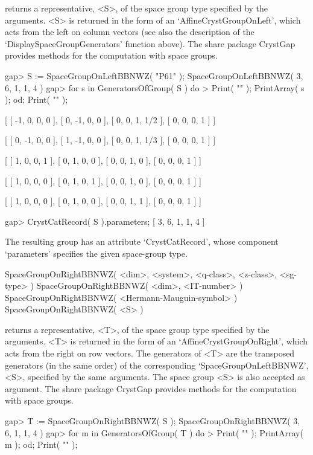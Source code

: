 returns a representative, <S>, of the space group type specified by 
the arguments. <S> is returned in the form of an `AffineCrystGroupOnLeft',
which acts from the left on column vectors (see also the description
of the `DisplaySpaceGroupGenerators' function above). The share package
CrystGap provides methods for the computation with space groups.

\beginexample
gap> S := SpaceGroupOnLeftBBNWZ( "P61" );
SpaceGroupOnLeftBBNWZ( 3, 6, 1, 1, 4 )
gap> for s in GeneratorsOfGroup( S ) do
>  Print( "\n" ); PrintArray( s ); od; Print( "\n" );

[ [   -1,    0,    0,    0 ],
  [    0,   -1,    0,    0 ],
  [    0,    0,    1,  1/2 ],
  [    0,    0,    0,    1 ] ]

[ [    0,   -1,    0,    0 ],
  [    1,   -1,    0,    0 ],
  [    0,    0,    1,  1/3 ],
  [    0,    0,    0,    1 ] ]

[ [  1,  0,  0,  1 ],
  [  0,  1,  0,  0 ],
  [  0,  0,  1,  0 ],
  [  0,  0,  0,  1 ] ]

[ [  1,  0,  0,  0 ],
  [  0,  1,  0,  1 ],
  [  0,  0,  1,  0 ],
  [  0,  0,  0,  1 ] ]

[ [  1,  0,  0,  0 ],
  [  0,  1,  0,  0 ],
  [  0,  0,  1,  1 ],
  [  0,  0,  0,  1 ] ]

gap> CrystCatRecord( S ).parameters;
[ 3, 6, 1, 1, 4 ]
\endexample

The resulting group has an attribute `CrystCatRecord', whose component
`parameters' specifies the given space-group type.

\>SpaceGroupOnRightBBNWZ( <dim>, <system>, <q-class>, <z-class>, <sg-type> )
\>SpaceGroupOnRightBBNWZ( <dim>, <IT-number> )
\>SpaceGroupOnRightBBNWZ( <Hermann-Mauguin-symbol> )
\>SpaceGroupOnRightBBNWZ( <S> )

returns a representative, <T>, of the space group type specified by 
the arguments. <T> is returned in the form of an `AffineCrystGroupOnRight',
which acts from the right on row vectors. The generators of <T> are the 
transposed generators (in the same order) of the corresponding 
`SpaceGroupOnLeftBBNWZ', <S>, specified by the same arguments.
The space group <S> is also accepted as argument. The share package
CrystGap provides methods for the computation with space groups.

\beginexample
gap> T := SpaceGroupOnRightBBNWZ( S );
SpaceGroupOnRightBBNWZ( 3, 6, 1, 1, 4 )
gap> for m in GeneratorsOfGroup( T ) do
>  Print( "\n" ); PrintArray( m ); od; Print( "\n" );
    
